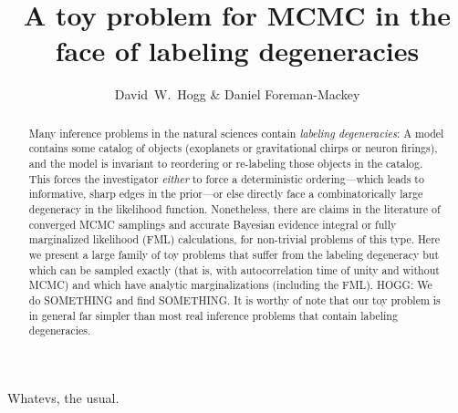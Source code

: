 \documentclass[12pt, preprint]{aastex}
\begin{document}
\title{A toy problem for MCMC in the face of labeling degeneracies}
\author{David~W.~Hogg \& Daniel Foreman-Mackey}

\begin{abstract}
Many inference problems in the natural sciences contain \emph{labeling
  degeneracies}:
A model contains some catalog of objects (exoplanets or gravitational
chirps or neuron firings), and the model is invariant to reordering or
re-labeling those objects in the catalog.
This forces the investigator \emph{either} to force a deterministic
ordering---which leads to informative, sharp edges in the prior---or else
directly face a combinatorically large degeneracy in the likelihood
function.
Nonetheless, there are claims in the literature of converged MCMC
samplings and accurate Bayesian evidence integral or fully
marginalized likelihood (FML) calculations, for non-trivial problems
of this type.
Here we present a large family of toy problems that suffer from the
labeling degeneracy but which can be sampled exactly (that is, with
autocorrelation time of unity and without MCMC) and which have
analytic marginalizations (including the FML).
HOGG: We do SOMETHING and find SOMETHING.
It is worthy of note that our toy problem is in general far simpler
than most real inference problems that contain labeling degeneracies.
\end{abstract}


Whatevs, the usual.
\end{document}
